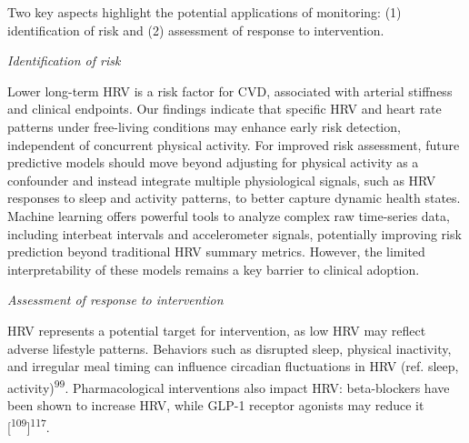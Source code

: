 \documentclass[
  a4paper,
  headsepline=true,
  open=any]{scrbook}
\begin{document}
Two key aspects highlight the potential applications of monitoring: (1)
identification of risk and (2) assessment of response to intervention.

\emph{Identification of risk}

Lower long-term HRV is a risk factor for CVD, associated with arterial
stiffness and clinical endpoints. Our findings indicate that specific
HRV and heart rate patterns under free-living conditions may enhance
early risk detection, independent of concurrent physical activity. For
improved risk assessment, future predictive models should move beyond
adjusting for physical activity as a confounder and instead integrate
multiple physiological signals, such as HRV responses to sleep and
activity patterns, to better capture dynamic health states. Machine
learning offers powerful tools to analyze complex raw time-series data,
including interbeat intervals and accelerometer signals, potentially
improving risk prediction beyond traditional HRV summary metrics.
However, the limited interpretability of these models remains a key
barrier to clinical adoption.

\emph{Assessment of response to intervention}

HRV represents a potential target for intervention, as low HRV may
reflect adverse lifestyle patterns. Behaviors such as disrupted sleep,
physical inactivity, and irregular meal timing can influence circadian
fluctuations in HRV (ref. sleep, activity)\textsuperscript{99}.
Pharmacological interventions also impact HRV: beta-blockers have been
shown to increase HRV, while GLP-1 receptor agonists may reduce it
{[}\textsuperscript{109}{]}\textsuperscript{117}.
\end{document}
